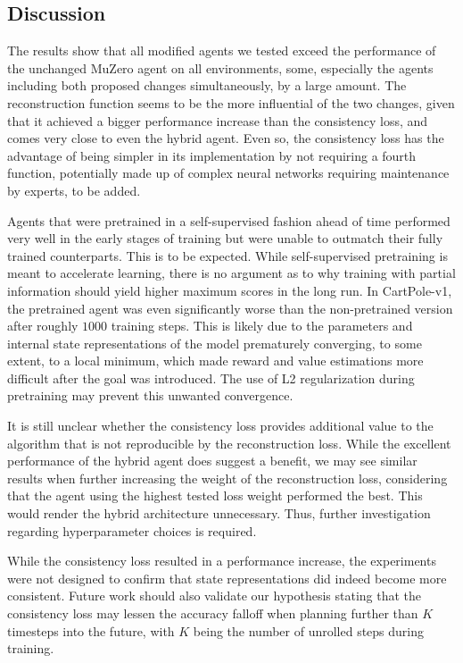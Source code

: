 \subsection{Discussion}
The results show that all modified agents we tested exceed the performance of the unchanged MuZero agent on all environments, some, especially the agents including both proposed changes simultaneously, by a large amount. The reconstruction function seems to be the more influential of the two changes, given that it achieved a bigger performance increase than the consistency loss, and comes very close to even the hybrid agent. Even so, the consistency loss has the advantage of being simpler in its implementation by not requiring a fourth function, potentially made up of complex neural networks requiring maintenance by experts, to be added.

Agents that were pretrained in a self-supervised fashion ahead of time performed very well in the early stages of training but were unable to outmatch their fully trained counterparts. This is to be expected. While self-supervised pretraining is meant to accelerate learning, there is no argument as to why training with partial information should yield higher maximum scores in the long run. In CartPole-v1, the pretrained agent was even significantly worse than the non-pretrained version after roughly $1000$ training steps. This is likely due to the parameters and internal state representations of the model prematurely converging, to some extent, to a local minimum, which made reward and value estimations more difficult after the goal was introduced. The use of L2 regularization during pretraining may prevent this unwanted convergence.

It is still unclear whether the consistency loss provides additional value to the algorithm that is not reproducible by the reconstruction loss. While the excellent performance of the hybrid agent does suggest a benefit, we may see similar results when further increasing the weight of the reconstruction loss, considering that the agent using the highest tested loss weight performed the best. This would render the hybrid architecture unnecessary. Thus, further investigation regarding hyperparameter choices is required.

While the consistency loss resulted in a performance increase, the experiments were not designed to confirm that state representations did indeed become more consistent. Future work should also validate our hypothesis stating that the consistency loss may lessen the accuracy falloff when planning further than $K$ timesteps into the future, with $K$ being the number of unrolled steps during training.
